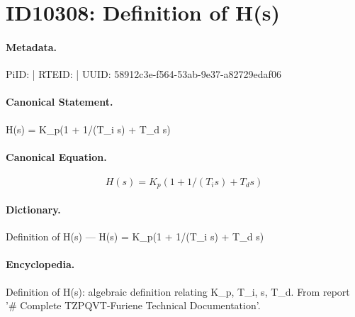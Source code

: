 \section*{ID10308: Definition of H(s)}
\paragraph{Metadata.}
PiID:  | RTEID:  | UUID: 58912c3e-f564-53ab-9e37-a82729edaf06

\paragraph{Canonical Statement.}
H(s) = K\_p(1 + 1/(T\_i s) + T\_d s)

\paragraph{Canonical Equation.}
\[
H(s) = K_p(1 + 1/(T_i s) + T_d s)
\]

\paragraph{Dictionary.}
Definition of H(s) — H(s) = K\_p(1 + 1/(T\_i s) + T\_d s)

\paragraph{Encyclopedia.}
Definition of H(s): algebraic definition relating K\_p, T\_i, s, T\_d. From report '\# Complete TZPQVT-Furiene Technical Documentation'.
